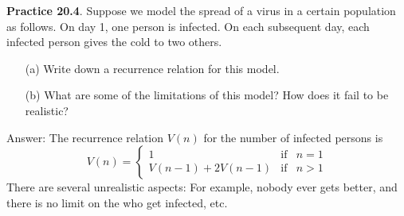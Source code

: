\documentclass[aspectratio=169]{beamer}
\begin{document}

\begin{frame}[plain]{}

  {\bf Practice 20.4}.  Suppose we model the spread of a virus in a certain population as follows.
  On day 1, one person is infected. On each subsequent day, each infected person gives the cold 
  to two others.
    \begin{itemize}
      \item[(a)] Write down a recurrence relation for this model.
      \item[(b)] What are some of the limitations of this model? How does it fail to be realistic?
    \end{itemize}
 \pause 
 
 \medskip
 
 Answer: The recurrence relation $V(n)$ for the number of infected persons is 
    \[ V(n) = \left\{ \begin{array}{ccc}
                       1 &\mbox{if}& n=1\\
                       V(n-1)+ 2V(n-1)&\mbox{if} & n>1
                      \end{array}\right. 
     \]       
     There are several unrealistic aspects: For example, nobody ever gets better, and there is no limit on the %
     who get infected, etc.      
        
     \vspace{.5in}
     
 \end{frame}
 
\end{document}
